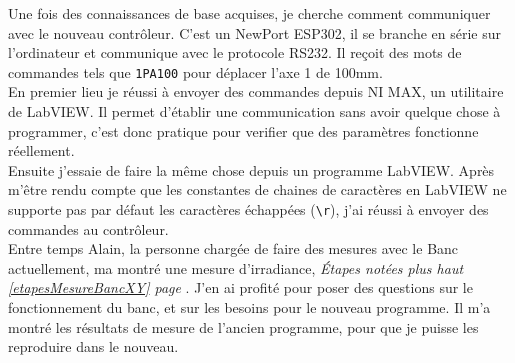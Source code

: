 \documentclass[12pt]{article}
\begin{document}
Une fois des connaissances de base acquises, je cherche comment communiquer avec le nouveau contrôleur.
C'est un NewPort ESP302, il se branche en série sur l'ordinateur et communique avec le protocole RS232.
Il reçoit des mots de commandes tels que \verb|1PA100| pour déplacer l'axe 1 de 100mm.\\
En premier lieu je réussi à envoyer des commandes depuis NI MAX, un utilitaire de LabVIEW.
Il permet d'établir une communication sans avoir quelque chose à programmer, c'est donc pratique pour verifier que des paramètres fonctionne réellement.\\
Ensuite j'essaie de faire la même chose depuis un programme LabVIEW.
Après m'être rendu compte que les constantes de chaines de caractères en LabVIEW ne supporte pas par défaut les caractères échappées (\texttt{\textbackslash r}), j'ai réussi à envoyer des commandes au contrôleur.\\
Entre temps Alain, la personne chargée de faire des mesures avec le Banc actuellement, ma montré une mesure d'irradiance, \textit{Étapes notées plus haut \ref{etapesMesureBancXY} page \pageref{etapesMesureBancXY}}.
J'en ai profité pour poser des questions sur le fonctionnement du banc, et sur les besoins pour le nouveau programme.
Il m'a montré les résultats de mesure de l'ancien programme, pour que je puisse les reproduire dans le nouveau.
\end{document}
